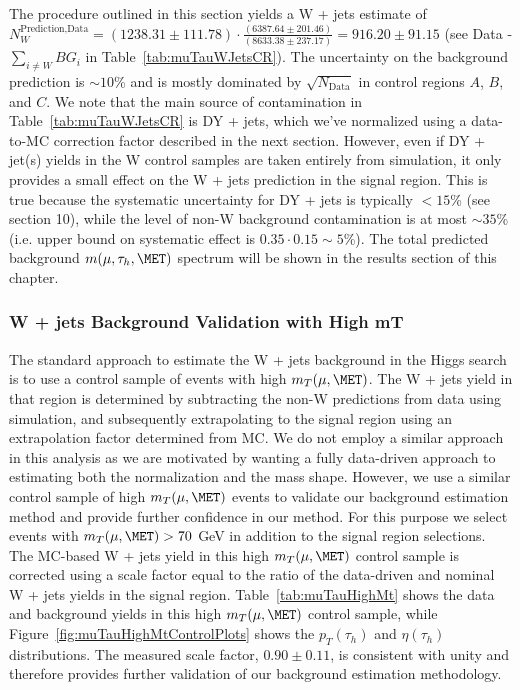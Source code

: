 The procedure outlined in this section yields a W + jets estimate of $N_{W}^{\textrm{Prediction,Data}} = (1238.31 \pm 111.78) \cdot \frac{(6387.64 
\pm 201.46)}{(8633.38 \pm 237.17)} = 916.20 \pm 91.15$ (see Data - $\sum\limits_{i\neq W} BG_{i}$ in Table~\ref{tab:muTauWJetsCR}). The uncertainty on the 
background prediction is $\sim 10$\% and is mostly dominated by $\sqrt{N_{\textrm{Data}}}$ in control regions $A$, $B$, and $C$. We note that the main source of 
contamination in Table~\ref{tab:muTauWJetsCR} is DY + jets, which we've normalized using a data-to-MC correction factor described in the next section. However, 
even if DY + jet(s) yields in the W control samples are taken entirely from simulation, it only provides a small effect on the W + jets prediction in the signal region. This is true 
because the systematic uncertainty for DY + jets is typically $< 15$\% (see section 10), while the level of non-W background contamination is at most $\sim 35$\% 
(i.e. upper bound on systematic effect is $0.35 \cdot 0.15 \sim 5$\%). The total predicted background
$m(\mu,\tau_{h},\MET)$ spectrum will be shown in the results section of this chapter.

\subsubsection{W + jets Background Validation with High mT}

The standard approach to estimate the W + jets background in the Higgs search is to use a control sample of events with high $m_{T}(\mu,\MET)$. 
The W + jets yield in that region is determined by subtracting the non-W predictions from data using simulation, and subsequently extrapolating to the 
signal region using an extrapolation factor determined from MC. We do not employ a similar approach in this analysis as we are motivated by wanting a fully 
data-driven approach to estimating both the normalization and the mass shape. However, we use a similar control sample of high $m_{T}(\mu,\MET)$ events to 
validate our background estimation method and provide further confidence in our method. For this purpose we select events with $m_{T}(\mu,\MET) > 70$ GeV in 
addition to the signal region selections. The MC-based W + jets yield in this high $m_{T}(\mu,\MET)$ control sample is corrected using a scale factor equal to the 
ratio of the data-driven and nominal W + jets yields in the signal region. Table~\ref{tab:muTauHighMt} shows the data and background yields in this high 
$m_{T}(\mu,\MET)$ control sample, while Figure~\ref{fig:muTauHighMtControlPlots} shows the $p_{T}(\tau_{h})$ and $\eta(\tau_{h})$ distributions. The measured 
scale factor, $0.90 \pm 0.11$, is consistent with unity and therefore provides further validation of our background estimation methodology.

